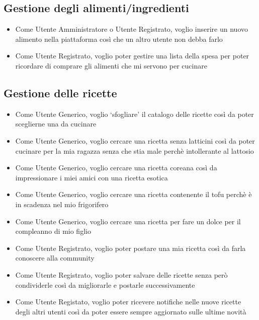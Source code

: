 \documentclass{article}
\begin{document}
\subsection{Gestione degli alimenti/ingredienti}
\begin{itemize}
    \item Come Utente Amministratore o Utente Registrato, voglio inserire un nuovo alimento nella piattaforma 
    così che un altro utente non debba farlo
    \item Come Utente Registrato, voglio poter gestire una lista della spesa per poter ricordare di comprare 
    gli alimenti che mi servono per cucinare
\end{itemize}

\subsection{Gestione delle ricette}
\begin{itemize}
    \item Come Utente Generico, voglio `sfogliare' il catalogo delle ricette così da poter sceglierne una da 
    cucinare
    \item Come Utente Generico, voglio cercare una ricetta senza latticini così da poter cucinare per la mia 
    ragazza senza che stia male perchè intollerante al lattosio
    \item Come Utente Generico, voglio cercare una ricetta coreana così da impressionare i miei amici con una
    ricetta esotica
    \item Come Utente Generico, voglio cercare una ricetta contenente il tofu perchè è in scadenza nel mio frigorifero
    \item Come Utente Generico, voglio cercare una ricetta per fare un dolce per il compleanno di mio figlio 
    \item Come Utente Registrato, voglio poter postare una mia ricetta così da farla conoscere alla community 
    \item Come Utente Registrato, voglio poter salvare delle ricette senza però condividerle così da migliorarle 
    e postarle successivamente
    \item Come Utente Registato, voglio poter ricevere notifiche nelle nuove ricette degli altri utenti 
    così da poter essere sempre aggiornato sulle ultime novità
\end{itemize}
\end{document}
